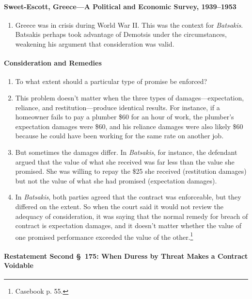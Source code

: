 \paragraph{Sweet-Escott, Greece---A Political and Economic Survey, 
1939--1953}

\begin{enumerate}
    \item Greece was in crisis during World War II. This was the context for 
    \emph{Batsakis}. Batsakis perhaps took advantage of Demotsis under the 
    circumstances, weakening his argument that consideration was valid.
\end{enumerate}

\paragraph{Consideration and Remedies}

\begin{enumerate}
    \item To what extent should a particular type of promise be enforced?
    \item This problem doesn't matter when the three types of 
    damages---expectation, reliance, and restitution---produce identical 
    results. For instance, if a homeowner fails to pay a plumber \$60 for an 
    hour of work, the plumber's expectation damages were \$60, and his 
    reliance damages were also likely \$60 because he could have been working 
    for the same rate on another job.
    \item But sometimes the damages differ. In \emph{Batsakis}, for instance, 
    the defendant argued that the value of what she received was far less than 
    the value she promised. She was willing to repay the \$25 she received 
    (restitution damages) but not the value of what she had promised 
    (expectation damages).
    \item In \emph{Batsakis}, both parties agreed that the contract was 
    enforceable, but they differed on the extent. So when the court said it 
    would not review the adequacy of consideration, it was saying that the 
    normal remedy for breach of contract is expectation damages, and it 
    doesn't matter whether the value of one promised performance exceeded the 
    value of the other.\footnote{Casebook p. 55.}
\end{enumerate}
 
\paragraph{Restatement Second \S\ 175: When Duress by Threat Makes a 
Contract Voidable}

